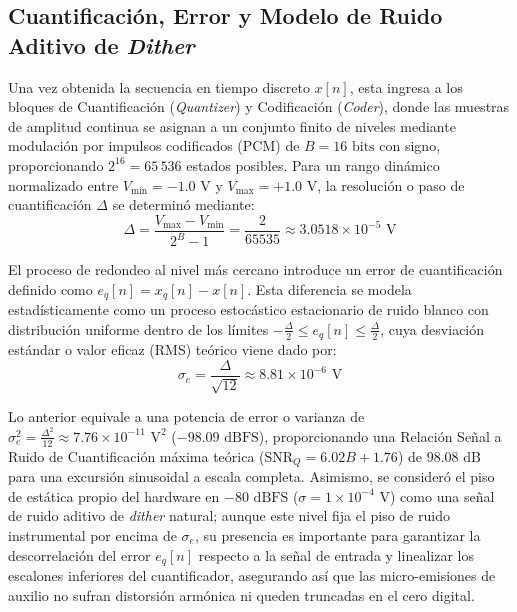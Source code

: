 \documentclass[journal, a4paper]{IEEEtran}
\begin{document}
\subsection{Cuantificación, Error y Modelo de Ruido Aditivo de \textit{Dither}}
Una vez obtenida la secuencia en tiempo discreto $x[n]$, esta ingresa a los bloques de Cuantificación (\textit{Quantizer}) y Codificación (\textit{Coder}), donde las muestras de amplitud continua se asignan a un conjunto finito de niveles mediante modulación por impulsos codificados (PCM) de $B = 16 \text{ bits}$ con signo, proporcionando $2^{16} = 65\,536$ estados posibles. Para un rango dinámico normalizado entre $V_{\min} = -1.0\text{ V}$ y $V_{\max} = +1.0\text{ V}$, la resolución o paso de cuantificación $\Delta$ se determinó mediante:
\begin{equation}
    \Delta = \frac{V_{\max} - V_{\min}}{2^B - 1} = \frac{2}{65535} \approx 3.0518 \times 10^{-5} \text{ V}
\end{equation}

El proceso de redondeo al nivel más cercano introduce un error de cuantificación definido como $e_q[n] = x_q[n] - x[n]$. Esta diferencia se modela estadísticamente como un proceso estocástico estacionario de ruido blanco con distribución uniforme dentro de los límites $-\frac{\Delta}{2} \le e_q[n] \le \frac{\Delta}{2}$, cuya desviación estándar o valor eficaz (RMS) teórico viene dado por:
\begin{equation}
    \sigma_e = \frac{\Delta}{\sqrt{12}} \approx 8.81 \times 10^{-6} \text{ V}
\end{equation}

Lo anterior equivale a una potencia de error o varianza de $\sigma_e^2 = \frac{\Delta^2}{12} \approx 7.76 \times 10^{-11} \text{ V}^2$ ($-98.09\text{ dBFS}$), proporcionando una Relación Señal a Ruido de Cuantificación máxima teórica ($\text{SNR}_Q = 6.02 B + 1.76$) de $98.08 \text{ dB}$ para una excursión sinusoidal a escala completa. Asimismo, se consideró el piso de estática propio del hardware en $-80 \text{ dBFS}$ ($\sigma = 1 \times 10^{-4}\text{ V}$) como una señal de ruido aditivo de \textit{dither} natural; aunque este nivel fija el piso de ruido instrumental por encima de $\sigma_e$, su presencia es importante para garantizar la descorrelación del error $e_q[n]$ respecto a la señal de entrada y linealizar los escalones inferiores del cuantificador, asegurando así que las micro-emisiones de auxilio no sufran distorsión armónica ni queden truncadas en el cero digital.
\end{document}
